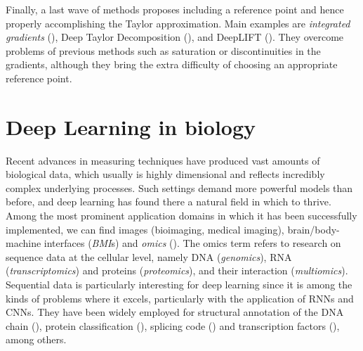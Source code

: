 Finally, a last wave of methods proposes including a reference point and hence properly accomplishing the Taylor approximation. Main examples are \textit{integrated gradients} (\cite{Sundararajan2017}), Deep Taylor Decomposition (\cite{Montavon2017}), and DeepLIFT (\cite{Shrikumar2017}). They overcome problems of previous methods such as saturation or discontinuities in the gradients, although they bring the extra difficulty of choosing an appropriate reference point.

\section{Deep Learning in biology}

Recent advances in measuring techniques have produced vast amounts of biological data, which usually is highly dimensional and reflects incredibly complex underlying processes. Such settings demand more powerful models than before, and deep learning has found there a natural field in which to thrive. Among the most prominent application domains in which it has been successfully implemented, we can find images (bioimaging, medical imaging), brain/body-machine interfaces (\textit{BMI}s) and \textit{omics} (\cite{Mahmud2018}). The omics term refers to research on sequence data at the cellular level, namely DNA (\textit{genomics}), RNA (\textit{transcriptomics}) and proteins (\textit{proteomics}), and their interaction (\textit{multiomics}). Sequential data is particularly interesting for deep learning since it is among the kinds of problems where it excels, particularly with the application of RNNs and CNNs. They have been widely employed for structural annotation of the DNA chain (\cite{Jones2017}), protein classification (\cite{Min2017}), splicing code (\cite{Mamoshina2016}) and transcription factors (\cite{Ching2017}), among others.

